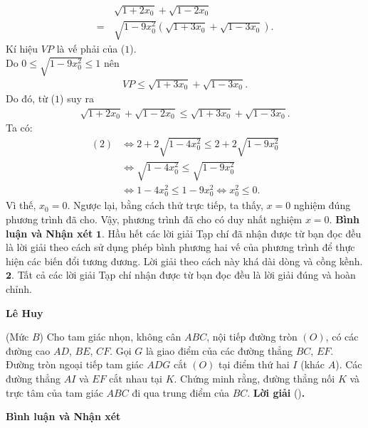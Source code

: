 \begin{multicols}{2}
\begin{align*}
		&\sqrt {1 + 2{x_0}}  + \sqrt {1 - 2{x_0}}  \\
		= \,&\sqrt {1 - 9x_0^2} \left( {\sqrt {1 + 3{x_0}}  + \sqrt {1 - 3{x_0}} } \right). \tag{$1$}
	\end{align*}
	Kí hiệu $VP$ là vế phải của ($1$).\\
	Do $0 \le \sqrt {1 - 9x_0^2}  \le 1$  nên
	\begin{align*}
		VP \le \sqrt {1 + 3{x_0}}  + \sqrt {1 - 3{x_0}} .
	\end{align*}
	Do đó, từ ($1$) suy ra
	\begin{align*}
		\sqrt {\!1 \!+\! 2{x_0}}  \!+\!\! \sqrt {\!1 \!-\! 2{x_0}}  \!\le\!\! \sqrt {\!1 \!+\! 3{x_0}}  \!+\!\! \sqrt {\!1 \!-\! 3{x_0}} .
	\end{align*}
	Ta có:
	\begin{align*}
		(2) &\Leftrightarrow 2 + 2\sqrt {1 - 4x_0^2}  \le 2 + 2\sqrt {1 - 9x_0^2} \\
		&\Leftrightarrow \sqrt {1 - 4x_0^2}  \le \sqrt {1 - 9x_0^2} \\
		&\Leftrightarrow 1 - 4x_0^2 \le 1 - 9x_0^2 \Leftrightarrow x_0^2 \le 0.
	\end{align*}  
	Vì thế,  $x_0 = 0$.
	\vskip 0.05cm
	Ngược lại, bằng cách thử trực tiếp, ta thấy, $x = 0$ nghiệm đúng phương trình đã cho.
	\vskip 0.05cm
	Vậy, phương trình đã cho có duy nhất nghiệm $x = 0$.
	\vskip 0.05cm
	\textbf{Bình luận và Nhận xét}
	\vskip 0.05cm
	$\pmb{1.}$ Hầu hết các lời giải Tạp chí đã nhận được từ bạn đọc đều là lời giải theo cách sử dụng phép bình phương hai vế của phương trình để thực hiện các biến đổi tương đương. Lời giải theo cách này khá dài dòng và cồng kềnh.
	\vskip 0.05cm
	$\pmb{2.}$ Tất cả các lời giải Tạp chí nhận được từ bạn đọc đều là lời giải đúng và hoàn chỉnh.
	\begin{flushright}
		\textbf{Lê Huy}
	\end{flushright}
	{}
	(Mức $B$) Cho tam giác nhọn, không cân $ABC$, nội tiếp đường tròn $(O)$, có các đường cao $AD$, $BE$, $CF$. Gọi $G$ là giao điểm của các đường thẳng $BC$, $EF$. Đường tròn ngoại tiếp tam giác $ADG$ cắt $(O)$ tại điểm thứ hai $I$ (khác $A$). Các đường thẳng $AI$ và $EF$ cắt nhau tại $K$. Chứng minh rằng, đường thẳng nối $K$ và trực tâm của tam giác $ABC$ đi qua trung điểm của $BC$.
	\vskip 0.05cm
	\textbf{Lời giải} ()\textbf{.}
	\vskip 0.05cm
	
	\textbf{Bình luận và Nhận xét}
	

\end{multicols}

